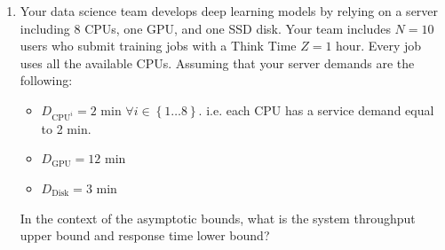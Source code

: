 \begin{enumerate}
    \newpage

    \item Your data science team develops deep learning models by relying on a server including 8 CPUs, one GPU, and one SSD disk. Your team includes $N = 10$ users who submit training jobs with a Think Time $Z = 1$ hour. Every job uses all the available CPUs. Assuming that your server demands are the following:
    \begin{itemize}
        \item $D_{\text{CPU}^{i}} = 2$ min $\forall i \in \left\{1 \dots 8\right\}$. i.e. each CPU has a service demand equal to 2 min.
        \item $D_{\text{GPU}} = 12$ min
        \item $D_{\text{Disk}} = 3$ min
    \end{itemize}
    In the context of the asymptotic bounds, what is the system throughput upper bound and response time lower bound?


\end{enumerate}
